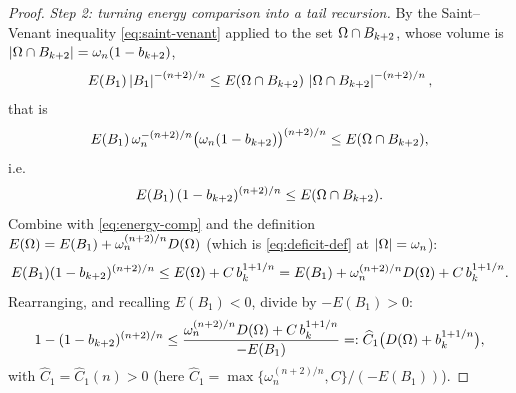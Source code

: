 \begin{proof}
\smallskip
\emph{Step 2: turning energy comparison into a tail recursion.}
By the Saint--Venant inequality \eqref{eq:saint-venant} applied to the
set $\Omega\cap B_{k+2}$, whose volume is
$\left|\Omega\cap B_{k+2}\right|=\omega_n(1-b_{k+2})$,
\[
   E(B_1)\left|B_1\right|^{-(n+2)/n}
   \le E(\Omega\cap B_{k+2})\,\left|\Omega\cap B_{k+2}\right|^{-(n+2)/n},
\]
that is
\[
   E(B_1)\,\omega_n^{-(n+2)/n}\bigl(\omega_n(1-b_{k+2})\bigr)^{(n+2)/n}
   \le E(\Omega\cap B_{k+2}),
\]
i.e.
\[
   E(B_1)\,(1-b_{k+2})^{(n+2)/n}\le E(\Omega\cap B_{k+2}).
\]
Combine with \eqref{eq:energy-comp} and the definition
$E(\Omega)=E(B_1)+\omega_n^{(n+2)/n}D(\Omega)$ (which is
\eqref{eq:deficit-def} at $\left|\Omega\right|=\omega_n$):
\[
   E(B_1)(1-b_{k+2})^{(n+2)/n}
   \le E(\Omega)+C\,b_k^{1+1/n}
   = E(B_1)+\omega_n^{(n+2)/n}D(\Omega)+C\,b_k^{1+1/n}.
\]
Rearranging, and recalling $E(B_1)<0$, divide by $-E(B_1)>0$:
\[
   1-(1-b_{k+2})^{(n+2)/n}
   \le\frac{\omega_n^{(n+2)/n}D(\Omega)+C\,b_k^{1+1/n}}{-E(B_1)}
   =:\widehat C_1\bigl(D(\Omega)+b_k^{1+1/n}\bigr),
\]
with $\widehat C_1=\widehat C_1(n)>0$
(here $\widehat C_1=\max\{\omega_n^{(n+2)/n},C\}/(-E(B_1))$).

\end{proof}
